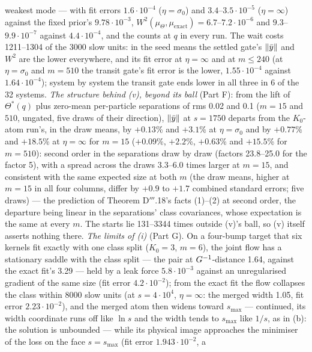 weakest mode --- with fit errors $1.6\cdot10^{-4}$ ($\eta = \sigma_0$) and $3.4$--$3.5\cdot10^{-5}$ ($\eta = \infty$)
against the fixed prior's $9.78\cdot10^{-3}$, $W^2(\mu_\Theta,\mu_{\mathrm{exact}}) = 6.7$--$7.2\cdot10^{-6}$ and
$9.3$--$9.9\cdot10^{-7}$ against $4.4\cdot10^{-4}$, and the counts at $q$ in every run. The wait costs 1211--1304 of
the 3000 slow units: in the seed means the settled gate's $\lVert \bar y\rVert$ and $W^2$ are the lower everywhere, and its
fit error at $\eta = \infty$ and at $m\le240$ (at $\eta = \sigma_0$ and $m = 510$ the transit gate's fit error is the
lower, $1.55\cdot10^{-4}$ against $1.64\cdot10^{-4}$); system by system the transit gate ends lower in all three in 6
of the 32 systems. \emph{The structure behind (v), beyond its ball} (Part F): from the lift of $\Theta^*(q)$ plus
zero-mean per-particle separations of rms 0.02 and 0.1 ($m = 15$ and $510$, ungated, five draws of their direction),
$\lVert \bar y\rVert$ at $s = 1750$ departs from the $K_0$-atom run's, in the draw means, by $+0.13$\% and $+3.1$\% at
$\eta = \sigma_0$ and by $+0.77$\% and $+18.5$\% at $\eta = \infty$ for $m = 15$ ($+0.09$\%, $+2.2$\%, $+0.63$\% and
$+15.5$\% for $m = 510$): second order in the separations draw by draw (factors 23.8--25.0 for the factor 5), with a
spread across the draws 3.3--6.0 times larger at $m = 15$, and consistent with the same expected size at both $m$ (the
draw means, higher at $m = 15$ in all four columns, differ by $+0.9$ to $+1.7$ combined standard errors; five draws)
--- the prediction of Theorem D$'''$.18's facts (1)--(2) at second order, the departure being linear in the
separations' class covariances, whose expectation is the same at every $m$. The starts lie 131--3344 times outside
(v)'s ball, so (v) itself asserts nothing there. \emph{The limits of (i)} (Part G). On a four-bump target that six
kernels fit exactly with one class split ($K_0 = 3$, $m = 6$), the joint flow has a stationary saddle with the class
split --- the pair at $G^{-1}$-distance 1.64, against the exact fit's 3.29 --- held by a leak force $5.8\cdot10^{-3}$
against an unregularised gradient of the same size (fit error $4.2\cdot10^{-2}$); from the exact fit the flow
collapses the class within 8000 slow units (at $s = 4\cdot10^4$, $\eta = \infty$: the merged width 1.05, fit error
$2.23\cdot10^{-2}$), and the merged atom then widens toward $s_{\max}$ --- continued, its width coordinate runs off
like $\ln s$ and the width tends to $s_{\max}$ like $1/s$, as in (b): the solution is unbounded --- while its physical
image approaches the minimiser of the loss on the face $s = s_{\max}$ (fit error $1.943\cdot10^{-2}$, a
